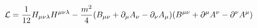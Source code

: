 \begin{equation}
{\cal L} = \frac{1}{12}H_{\mu\nu\lambda}H^{\mu\nu\lambda} - \frac{m^2}{4} (B_{\mu\nu} + \partial_\mu A_\nu - 
\partial_\nu A_\mu ) (B^{\mu\nu} + \partial^\mu A^\nu -
\partial^\nu A^\mu )
\label{n1}
\end{equation}


